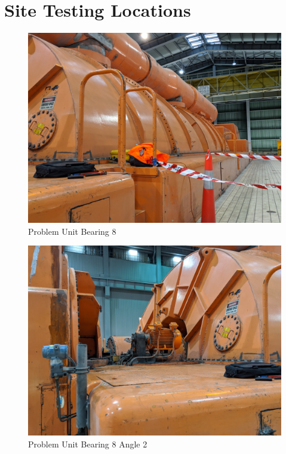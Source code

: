\documentclass{UoNMCHA}
\numberwithin{equation}{section}
\begin{document}
\section{Site Testing Locations} \label{app:Site Testing}
    \begin{figure}[H]
        \centering
        \includegraphics[keepaspectratio, width = \textwidth]{Figures/U5_LPB_8.png}
        \caption{Problem Unit Bearing 8}
    \end{figure}
    \begin{figure}[H]
        \centering
        \includegraphics[keepaspectratio, width = \textwidth]{Figures/U5_LPB_8_2.png}
        \caption{Problem Unit Bearing 8 Angle 2}
    \end{figure}
\end{document}
